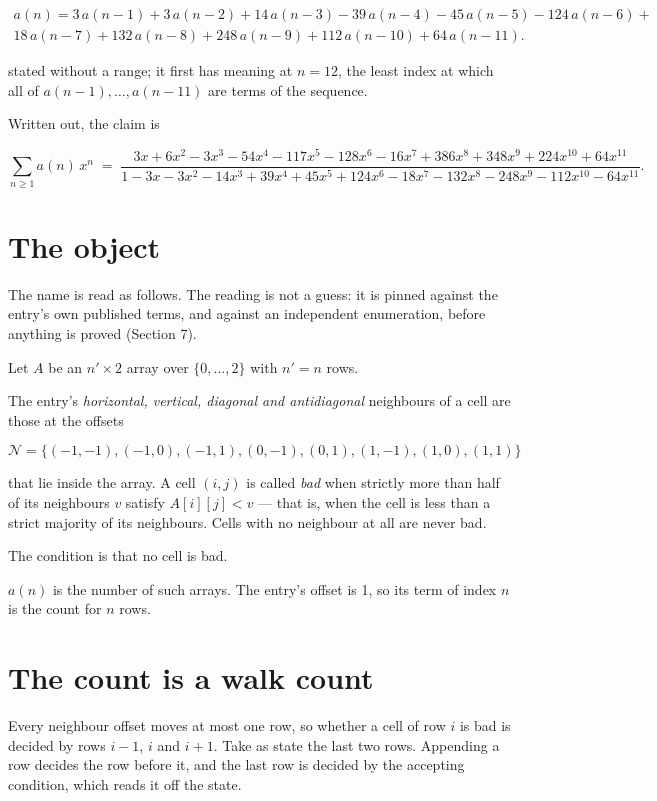 \documentclass[11pt]{article}
\theoremstyle{definition}
\begin{document}
\begin{multline*} a(n) = 3\,a(n-1) + 3\,a(n-2) + 14\,a(n-3) - 39\,a(n-4) - 45\,a(n-5) - 124\,a(n-6) + \\ 18\,a(n-7) + 132\,a(n-8) + 248\,a(n-9) + 112\,a(n-10) + 64\,a(n-11). \end{multline*}

stated without a range; it first has meaning at $n = 12$, the least index at which all of $a(n-1),\dots,a(n-11)$ are terms of the sequence.

Written out, the claim is

\[\sum_{n \ge 1} a(n)\,x^n \;=\; \frac{3x + 6x^{2} - 3x^{3} - 54x^{4} - 117x^{5} - 128x^{6} - 16x^{7} + 386x^{8} + 348x^{9} + 224x^{10} + 64x^{11}}{1 - 3x - 3x^{2} - 14x^{3} + 39x^{4} + 45x^{5} + 124x^{6} - 18x^{7} - 132x^{8} - 248x^{9} - 112x^{10} - 64x^{11}}.\]

\section{The object}

The name is read as follows. The reading is not a guess: it is pinned against the entry's own published terms, and against an independent enumeration, before anything is proved (Section 7).

Let $A$ be an $n' \times 2$ array over $\{0,\dots,2\}$ with $n' = n$ rows.

The entry's {\itshape horizontal, vertical, diagonal and antidiagonal} neighbours of a cell are those at the offsets

\[\mathcal{N} = \{(-1,-1), (-1,0), (-1,1), (0,-1), (0,1), (1,-1), (1,0), (1,1)\}\]

that lie inside the array. A cell $(i,j)$ is called {\itshape bad} when strictly more than half of its neighbours $v$ satisfy $A[i][j] < v$ --- that is, when the cell is less than a strict majority of its neighbours. Cells with no neighbour at all are never bad.

The condition is that no cell is bad.

$a(n)$ is the number of such arrays. The entry's offset is 1, so its term of index $n$ is the count for $n$ rows.

\section{The count is a walk count}

Every neighbour offset moves at most one row, so whether a cell of row $i$ is bad is decided by rows $i-1$, $i$ and $i+1$. Take as state the last two rows. Appending a row decides the row before it, and the last row is decided by the accepting condition, which reads it off the state.
\end{document}
